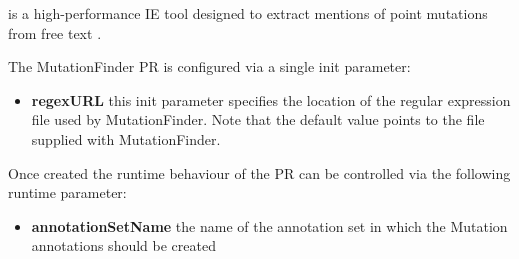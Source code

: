 
 is a high-performance IE tool
designed to extract mentions of point mutations from free text \cite{Caporaso2007}.

The MutationFinder PR is configured via a single init parameter:
\begin{itemize}
\item \textbf{regexURL} this init parameter specifies the location of the regular expression file used
  by MutationFinder. Note that the default value points to the file supplied with MutationFinder.
\end{itemize}

Once created the runtime behaviour of the PR can be controlled via the following runtime parameter:
\begin{itemize}
\item \textbf{annotationSetName} the name of the annotation set in which the Mutation annotations should be created
\end{itemize}


% 
